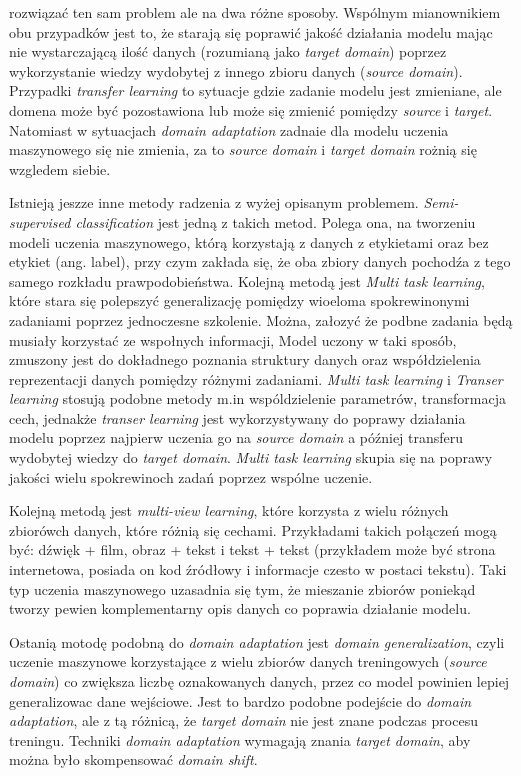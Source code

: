         rozwiązać ten sam problem ale na dwa różne sposoby. Wspólnym mianownikiem obu przypadków jest to, że starają się poprawić jakość działania modelu mając nie wystarczającą ilość danych (rozumianą jako \textit{target domain}) poprzez wykorzystanie wiedzy wydobytej z innego zbioru danych (\textit{source domain}). Przypadki \textit{transfer learning} to sytuacje gdzie zadanie modelu jest zmieniane, ale domena może być pozostawiona lub może się zmienić pomiędzy \textit{source} i \textit{target}. Natomiast w sytuacjach \textit{domain adaptation} zadnaie dla modelu uczenia maszynowego się nie zmienia, za to \textit{source domain} i \textit{target domain} rożnią się wzgledem siebie.
        \par
        Istnieją jeszze inne metody radzenia z wyżej opisanym problemem. \textit{Semi-supervised classification}\cite{semi-sup-learning} jest jedną z takich metod. Polega ona, na tworzeniu modeli uczenia maszynowego, którą korzystają z danych z etykietami oraz bez etykiet (ang. label), przy czym zakłada się, że oba zbiory danych pochodźa z tego samego rozkładu prawpodobieństwa. Kolejną metodą jest \textit{Multi task learning}\cite{multitask-learning}, które stara się polepszyć generalizację pomiędzy wioeloma spokrewinonymi zadaniami poprzez jednoczesne szkolenie. Można, załozyć że podbne zadania będą musiały korzystać ze wspołnych informacji, Model uczony w taki sposób, zmuszony jest do dokładnego poznania struktury danych oraz współdzielenia reprezentacji danych pomiędzy różnymi zadaniami. \textit{Multi task learning} i \textit{Transer learning} stosują podobne metody m.in wspóldzielenie parametrów, transformacja cech, jednakże \textit{transer learning} jest wykorzystywany do poprawy działania modelu poprzez najpierw uczenia go na \textit{source domain} a później transferu wydobytej wiedzy do \textit{target domain}. \textit{Multi task learning} skupia się na poprawy jakości wielu spokrewinoch zadań poprzez wspólne uczenie.
        \par
        Kolejną metodą jest \textit{multi-view learning}, które korzysta z wielu różnych zbiorówch danych, które różnią się cechami. Przykładami takich połączeń mogą być: dźwięk + film, obraz + tekst i tekst + tekst (przykładem może być strona internetowa, posiada on kod źródłowy i informacje czesto w postaci tekstu). Taki typ uczenia maszynowego uzasadnia się tym, że mieszanie zbiorów poniekąd tworzy pewien komplementarny opis danych co poprawia działanie modelu. 
        \par
        Ostanią motodę podobną do \textit{domain adaptation} jest \textit{domain generalization}\cite{domain-generalization}, czyli uczenie maszynowe korzystające z wielu zbiorów danych treningowych (\textit{source domain}) co zwiększa liczbę oznakowanych danych, przez co model powinien lepiej generalizowac dane wejściowe. Jest to bardzo podobne podejście do \textit{domain adaptation}, ale z tą różnicą, że \textit{target domain} nie jest znane podczas procesu treningu. Techniki \textit{domain adaptation} wymagają znania \textit{target domain}, aby można było skompensować \textit{domain shift}.
        
